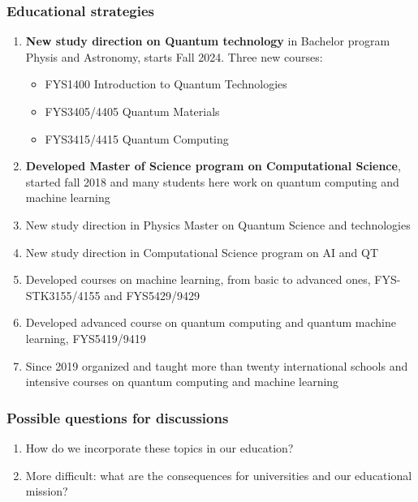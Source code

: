 \documentclass{beamer}
\begin{document}
\begin{frame}
\frametitle{Educational strategies}

\begin{enumerate}
\item \textbf{New study direction on Quantum technology} in Bachelor program Physis and Astronomy, starts Fall 2024. Three new courses:
\begin{itemize}

  \item FYS1400 Introduction to Quantum Technologies

  \item FYS3405/4405 Quantum Materials

  \item FYS3415/4415 Quantum Computing

\end{itemize}

\noindent
\item \textbf{Developed Master of Science program on Computational Science}, started fall  2018 and many students here work on quantum computing and machine learning

\item New study direction in Physics Master on Quantum Science and technologies

\item New study direction in Computational Science program on AI and QT

\item Developed courses on machine learning, from basic to advanced ones, FYS-STK3155/4155 and FYS5429/9429

\item Developed advanced course on quantum computing and quantum machine learning, FYS5419/9419

\item Since 2019 organized and taught more than twenty  international schools and intensive courses on quantum computing and machine learning
\end{enumerate}

\noindent
\end{frame}

\begin{frame}
\frametitle{Possible questions for discussions}

\begin{enumerate}
\item How do we incorporate these topics in our education?

\item More difficult: what are the consequences for universities and our educational mission?
\end{enumerate}

\noindent
\end{frame}
\end{document}
